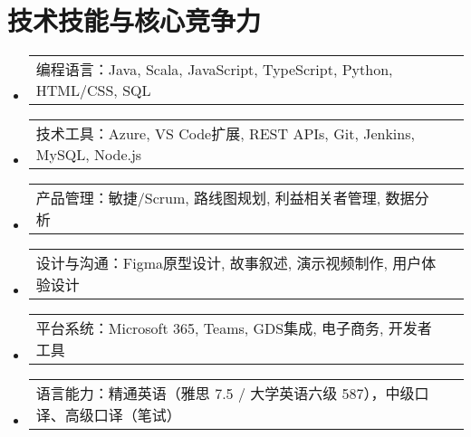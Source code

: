 \documentclass[letterpaper,11pt]{article}
\makeatletter
\newcommand{\resumeCustomSubheading}[2]{
  \vspace{-1pt}\item
    \begin{tabular*}{0.97\textwidth}{l@{\extracolsep{\fill}}r}
      #1 & #2 \\
    \end{tabular*}\vspace{-6pt}
}
\newcommand{\resumeSubHeadingListStart}{\begin{itemize}[leftmargin=*]}
\newcommand{\resumeSubHeadingListEnd}{\end{itemize}}
\makeatother
\begin{document}

\section{技术技能与核心竞争力}
\resumeSubHeadingListStart
    \resumeCustomSubheading{编程语言：Java, Scala, JavaScript, TypeScript, Python, HTML/CSS, SQL} {}
    \resumeCustomSubheading{技术工具：Azure, VS Code扩展, REST APIs, Git, Jenkins, MySQL, Node.js} {}
    \resumeCustomSubheading{产品管理：敏捷/Scrum, 路线图规划, 利益相关者管理, 数据分析} {}
    \resumeCustomSubheading{设计与沟通：Figma原型设计, 故事叙述, 演示视频制作, 用户体验设计} {}
    \resumeCustomSubheading{平台系统：Microsoft 365, Teams, GDS集成, 电子商务, 开发者工具} {}
    \resumeCustomSubheading{语言能力：精通英语（雅思 7.5 / 大学英语六级 587），中级口译、高级口译（笔试）} {}
\resumeSubHeadingListEnd

\end{document}
